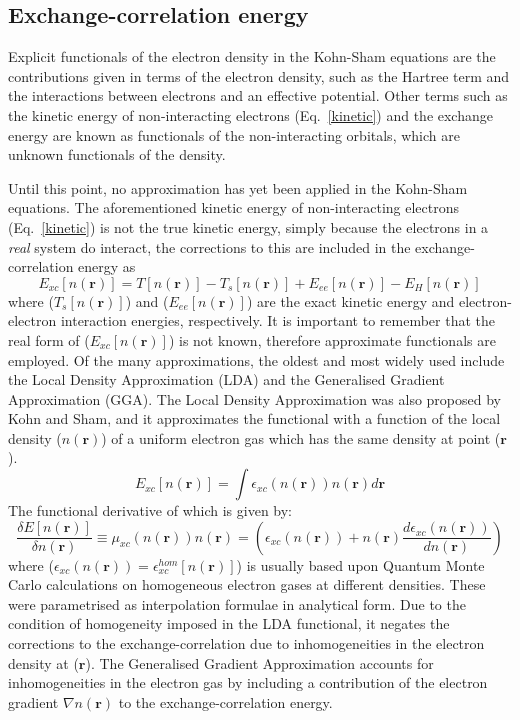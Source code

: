 \subsection{Exchange-correlation energy}
Explicit functionals of the electron density in the Kohn-Sham equations are the contributions given in terms of the electron density, such as the Hartree term and the interactions between electrons and an effective potential. Other terms such as the kinetic energy of non-interacting electrons (Eq.~\ref{kinetic}) and the exchange energy are known as functionals of the non-interacting orbitals, which are unknown functionals of the density.

Until this point, no approximation has yet been applied in the Kohn-Sham equations. The aforementioned kinetic energy of non-interacting electrons (Eq.~\ref{kinetic}) is not the true kinetic energy, simply because the electrons in a \textit{real} system do interact, the corrections to this are included in the exchange-correlation energy as 
%
\begin{equation}
E_{xc}[n(\mathbf{r})] = T[n(\mathbf{r})] - T_s [n(\mathbf{r})] + E_{ee}[n(\mathbf{r})] - E_H[n(\mathbf{r})]
\end{equation}
%
where ($T_s [n(\mathbf{r})]$) and ($E_{ee}[n(\mathbf{r})]$) are the exact kinetic energy and electron-electron interaction energies, respectively. It is important to remember that the real form of ($E_{xc}[n(\mathbf{r})]$) is not known, therefore approximate functionals are employed. Of the many approximations, the oldest and most widely used include the Local Density Approximation (LDA) and the Generalised Gradient Approximation (GGA).
%
The Local Density Approximation was also proposed by Kohn and Sham, \cite{kohnsham} and it approximates the functional with a function of the local density ($n(\mathbf{r})$) of a uniform electron gas which has the same density at point ($\mathbf{r}$).
%
\begin{equation}
E_{xc}[n(\mathbf{r})] = \int \epsilon_{xc} (n(\mathbf{r}))n(\mathbf{r}) d\mathbf{r}
\end{equation}
%
The functional derivative of which is given by:
%
\begin{equation}
\frac{\delta E[n(\mathbf{r})]}{\delta n(\mathbf{r})} \equiv \mu_{xc}(n(\mathbf{r}))n(\mathbf{r}) = \left(\epsilon_{xc} (n(\mathbf{r})) + n(\mathbf{r}) \frac{d \epsilon_{xc}(n(\mathbf{r}))}{d n(\mathbf{r})} \right)
\end{equation}
%
where ($\epsilon_{xc}(n(\mathbf{r})) = \epsilon_{xc}^{hom}[n(\mathbf{r})]$) is usually based upon Quantum Monte Carlo calculations on homogeneous electron gases at different densities.\cite{ceperley} These were parametrised as interpolation formulae in analytical form.\cite{perdew} Due to the condition of homogeneity imposed in the LDA functional, it negates the corrections to the exchange-correlation due to inhomogeneities in the electron density at ($\mathbf{r}$). The Generalised Gradient Approximation accounts for inhomogeneities in the electron gas by including a contribution of the electron gradient $\nabla n(\mathbf{r})$ to the exchange-correlation energy.\cite{gga}
